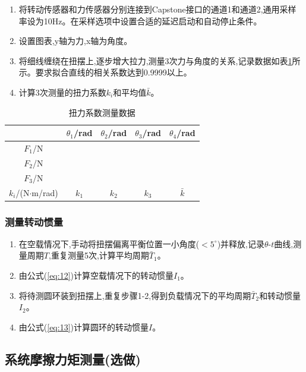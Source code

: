 \documentclass[UTF8]{ctexart}
\begin{document}
    \begin{enumerate}
    \item 将转动传感器和力传感器分别连接到Capstone接口的通道1和通道2,通用采样率设为10Hz。在采样选项中设置合适的延迟启动和自动停止条件。
    \item 设置图表,y轴为力,x轴为角度。
    \item 将细线缠绕在扭摆上,逐步增大拉力,测量3次力与角度的关系,记录数据如表\ref{tab:3}所示。要求拟合直线的相关系数达到0.9999以上。
    \item 计算3次测量的扭力系数$k_i$和平均值$\bar{k}$。
    \end{enumerate}
    
    \begin{table}[htbp]
    \centering
    \caption{扭力系数测量数据} \label{tab:3}
    \begin{tabular}{ccccc}
    \hline
     & $\theta_1$/rad & $\theta_2$/rad & $\theta_3$/rad & $\theta_4$/rad\\
    \hline  
    $F_1$/N &  &  &  & \\ 
    $F_2$/N &  &  &  & \\
    $F_3$/N &  &  &  & \\
    \hline
    $k_i$/(N$\cdot$m/rad) & $k_1$ & $k_2$ & $k_3$ & $\bar{k}$\\  
    \hline
    \end{tabular}
    \end{table}
    
    \subsubsection{测量转动惯量}
    
    \begin{enumerate}
    \item 在空载情况下,手动将扭摆偏离平衡位置一小角度($<5^\circ$)并释放,记录$\theta$-$t$曲线,测量周期$T$,重复测量5次,计算平均周期$\bar{T}_1$。
    \item 由公式(\ref{eq:12})计算空载情况下的转动惯量$I_1$。
    \item 将待测圆环装到扭摆上,重复步骤1-2,得到负载情况下的平均周期$\bar{T}_2$和转动惯量$I_2$。
    \item 由公式(\ref{eq:13})计算圆环的转动惯量$I$。
    \end{enumerate}
    
    \subsection{系统摩擦力矩测量(选做)}
    
\end{document}
